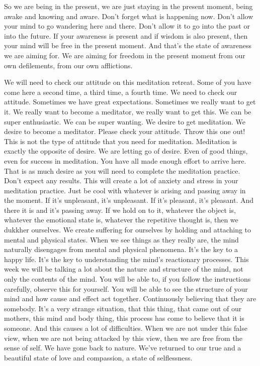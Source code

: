 \documentclass[letterpaper,10pt,english]{sphinxmanual}
\begin{document}
\sphinxAtStartPar
So  we  are  being  in  the  present,  we  are  just  staying  in  the  present
moment,  being  awake  and  knowing  and  aware.  Don’t  forget  what  is  happening now. Don’t allow your mind to go wandering here and there. Don’t
allow it to go into the past or into the future. If your awareness is present
and  if  wisdom  is  also  present,  then  your  mind  will  be  free  in  the  present
moment. And that’s the state of awareness we are aiming for. We are aiming
for freedom in the present moment from our own defilements, from our own
afflictions.

\sphinxAtStartPar
We will need to check our attitude on this meditation retreat. Some of
you have come here a second time, a third time, a fourth time. We need to
check our attitude. Sometimes we have great expectations. Sometimes we
   really want to get it. We really want to become a meditator, we really want to
get this. We can be super enthusiastic. We can be super wanting. We desire to
get meditation. We desire to become a meditator. Please check your attitude.
Throw this one out! This is not the type of attitude that you need for meditation. Meditation is exactly the opposite of desire. We are letting go of desire.
Even  of  good  things,  even  for  success  in  meditation.  You  have  all  made
enough effort to arrive here. That is as much desire as you will need to complete the meditation practice. Don’t expect any results. This will create a lot
of anxiety and stress in your meditation practice. Just be cool with whatever
is arising and passing away in the moment. If it’s unpleasant, it’s unpleasant.
If it’s pleasant, it’s pleasant. And there it is and it’s passing away. If we hold
on  to  it,  whatever  the  object  is,  whatever  the  emotional  state  is,  whatever
the repetitive thought is, then we dukkher ourselves. We create suffering for
ourselves by holding and attaching to mental and physical states. When we
see things as they really are, the mind naturally disengages from mental and
physical phenomena. It’s the key to a happy life. It’s the key to understanding  the  mind’s  reactionary  processes.  This  week  we  will  be  talking  a  lot
about the nature and structure of the mind, not only the contents of the mind.
You will be able to, if you follow the instructions carefully, observe this for
yourself. You will be able to see the structure of your mind and how cause
and effect act together. Continuously believing that they are somebody. It’s a
very strange situation, that this thing, that came out of our mothers, this mind
and body thing, this process has come to believe that it is someone. And this
causes a lot of difficulties. When we are not under this false view, when we
are not being attacked by this view, then we are free from the sense of self.
We have gone back to nature. We’ve returned to our true and a beautiful state
of love and compassion, a state of selflessness.
\end{document}
